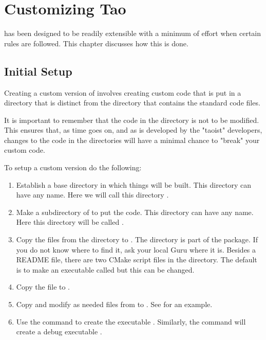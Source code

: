 \chapter{Customizing Tao}
\label{c:custom.tao}

\tao has been designed to be readily extensible with a minimum of
effort when certain rules are followed. 
This chapter discusses how this is done.

\section{Initial Setup}
\label{cust.init}

Creating a custom version of \tao involves creating custom code that
is put in a directory that is distinct from the  directory that
contains the standard \tao code files. 

It is important to
remember that the code in the  directory is not to be modified.
This ensures that, as time goes on, and as \tao is developed by the 
"taoist" developers, changes to the code in the  directories
will have a minimal chance to "break" your custom code.

To setup a custom \tao version do the following:
  \begin{enumerate}
  \item
Establish a base directory in which things will be
built. This directory can have any name.
Here we will call this directory .
  \item
Make a subdirectory of  to put the code. 
This directory can have any name.
Here this directory will be called .
  \item
Copy the files from the directory  to
. The  directory is part of the \bmad
package. If you do not know where to find it,
ask your local Guru where it is. Besides a README file,
there are two CMake script files in the 
directory. The default is to make an executable called
 but this can be changed. 
  \item
Copy the file  to .
  \item
Copy and modify as needed  files from 
 to . See  for an
example.
  \item
Use the command  to create the executable 
. Similarly,
the command  will create a debug executable
.
	\end{enumerate}

